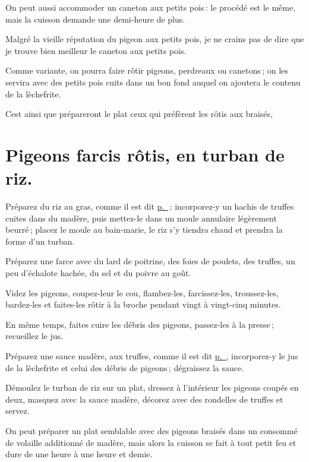 \sk

On peut aussi accommoder un caneton aux petits pois : le procédé est le même,
mais la cuisson demande une demi-heure de plus.

Malgré la vieille réputation du pigeon aux petits pois, je ne crains pas de dire
que je trouve bien meilleur le caneton aux petits pois.

\sk

Comme variante, on pourra faire rôtir pigeons, perdreaux ou canetons ; on les
servira avec des petits pois cuits dans un bon fond auquel on ajoutera le
contenu de la lèchefrite.

Cest ainsi que prépareront le plat ceux qui préfèrent les rôtis aux braisés,

\section*{\centering Pigeons farcis rôtis, en turban de riz.}
{}

Préparez du riz au gras, comme il est dit \hyperlink{p0708}{p. \pageref{pg0708}} ;
incorporez-y un hachis de truffes cuites dans du madère, puis mettez-le dans un
moule annulaire légèrement beurré ; placez le moule au bain-marie, le riz s'y
tiendra chaud et prendra la forme d'un turban.

Préparez une farce avec du lard de poitrine, des foies de poulets, des truffes,
un peu d'échalote hachée, du sel et du poivre au goût.

Videz les pigeons, coupez-leur le cou, flambez-les, farcissez-les, troussez-les,
bardez-les et faites-les rôtir à la broche pendant vingt à vingt-cinq minutes.

En même temps, faites cuire les débris des pigeons, passez-les à la presse ;
recueillez le jus.

Préparez une sauce madère, aux truffes, comme il est dit
\hyperlink{p0459}{p. \pageref{pg0459}}, incorporez-y le jus de la lèchefrite et
celui des débris de pigeons ; dégraissez la sauce.

Démoulez le turban de riz sur un plat, dressez à l'intérieur les pigeons coupés
en deux, masquez avec la sauce madère, décorez avec des rondelles de truffes et
servez.

\sk

On peut préparer un plat semblable avec des pigeons braisés dans un consommé de
volaille additionné de madère, mais alors la cuisson se fait à tout petit feu
et dure de une heure à une heure et demie.


